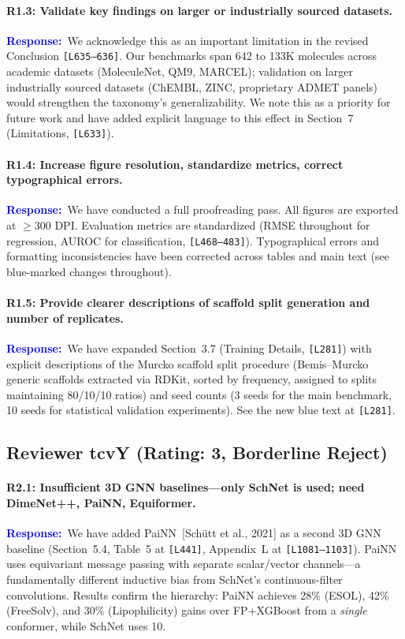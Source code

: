\documentclass[11pt]{article}
\newcommand{\reviewer}[1]{\subsection*{#1}}
\newcommand{\point}[1]{\paragraph{#1}}
\newcommand{\response}{\textcolor{blue}{\textbf{Response:}}~}
\newcommand{\lines}[1]{\texttt{[L#1]}}
\begin{document}
\point{R1.3: Validate key findings on larger or industrially sourced datasets.}

\response We acknowledge this as an important limitation in the revised Conclusion \lines{635--636}. Our benchmarks span 642 to 133K molecules across academic datasets (MoleculeNet, QM9, MARCEL); validation on larger industrially sourced datasets (ChEMBL, ZINC, proprietary ADMET panels) would strengthen the taxonomy's generalizability. We note this as a priority for future work and have added explicit language to this effect in Section~7 (Limitations, \lines{633}).

\point{R1.4: Increase figure resolution, standardize metrics, correct typographical errors.}

\response We have conducted a full proofreading pass. All figures are exported at $\geq$300 DPI. Evaluation metrics are standardized (RMSE throughout for regression, AUROC for classification, \lines{468--483}). Typographical errors and formatting inconsistencies have been corrected across tables and main text (see blue-marked changes throughout).

\point{R1.5: Provide clearer descriptions of scaffold split generation and number of replicates.}

\response We have expanded Section~3.7 (Training Details, \lines{281}) with explicit descriptions of the Murcko scaffold split procedure (Bemis--Murcko generic scaffolds extracted via RDKit, sorted by frequency, assigned to splits maintaining 80/10/10 ratios) and seed counts (3 seeds for the main benchmark, 10 seeds for statistical validation experiments). See the new blue text at \lines{281}.

\reviewer{Reviewer tcvY (Rating: 3, Borderline Reject)}

\point{R2.1: Insufficient 3D GNN baselines---only SchNet is used; need DimeNet++, PaiNN, Equiformer.}

\response We have added PaiNN~[Sch\"utt et al., 2021] as a second 3D GNN baseline (Section~5.4, Table~5 at \lines{441}, Appendix~L at \lines{1081--1103}). PaiNN uses equivariant message passing with separate scalar/vector channels---a fundamentally different inductive bias from SchNet's continuous-filter convolutions. Results confirm the hierarchy: PaiNN achieves 28\% (ESOL), 42\% (FreeSolv), and 30\% (Lipophilicity) gains over FP+XGBoost from a \emph{single} conformer, while SchNet uses 10.
\end{document}
